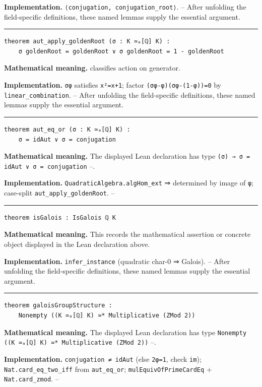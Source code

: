 \documentclass[UTF8,a4paper,11pt,fontset=fandol]{ctexart}
\theoremstyle{definition}
\newcommand{\statementsep}{\par\medskip\hrule\medskip}
\begin{document}
\noindent\textbf{Implementation.} \texttt{⟨conjugation, conjugation\_\allowbreak{}root⟩}. -- After unfolding the field-specific definitions, these named lemmas supply the essential argument.\par
\statementsep
\begin{verbatim}
theorem aut_apply_goldenRoot (σ : K ≃ₐ[ℚ] K) :
    σ goldenRoot = goldenRoot ∨ σ goldenRoot = 1 - goldenRoot
\end{verbatim}
\noindent\textbf{Mathematical meaning.} classifies action on generator.\par
\noindent\textbf{Implementation.} \texttt{σφ} satisfies \texttt{x²=x+1}; factor \texttt{(σφ-φ)(σφ-(1-φ))=0} by \texttt{linear\_\allowbreak{}combination}. -- After unfolding the field-specific definitions, these named lemmas supply the essential argument.\par
\statementsep
\begin{verbatim}
theorem aut_eq_or (σ : K ≃ₐ[ℚ] K) :
    σ = idAut ∨ σ = conjugation
\end{verbatim}
\noindent\textbf{Mathematical meaning.} The displayed Lean declaration has type \texttt{(σ) → σ = idAut ∨ σ = conjugation} --.\par
\noindent\textbf{Implementation.} \texttt{QuadraticAlgebra.\allowbreak{}algHom\_\allowbreak{}ext} ⇒ determined by image of \texttt{φ}; case-split \texttt{aut\_\allowbreak{}apply\_\allowbreak{}goldenRoot}. --\par
\statementsep
\begin{verbatim}
theorem isGalois : IsGalois ℚ K
\end{verbatim}
\noindent\textbf{Mathematical meaning.} This records the mathematical assertion or concrete object displayed in the Lean declaration above.\par
\noindent\textbf{Implementation.} \texttt{infer\_\allowbreak{}instance} (quadratic char-0 ⇒ Galois). -- After unfolding the field-specific definitions, these named lemmas supply the essential argument.\par
\statementsep
\begin{verbatim}
theorem galoisGroupStructure :
    Nonempty ((K ≃ₐ[ℚ] K) ≃* Multiplicative (ZMod 2))
\end{verbatim}
\noindent\textbf{Mathematical meaning.} The displayed Lean declaration has type \texttt{Nonempty ((K ≃ₐ[ℚ] K) ≃* Multiplicative (ZMod 2))} --.\par
\noindent\textbf{Implementation.} \texttt{conjugation ≠ idAut} (else \texttt{2φ=1}, check \texttt{im}); \texttt{Nat.\allowbreak{}card\_\allowbreak{}eq\_\allowbreak{}two\_\allowbreak{}iff} from \texttt{aut\_\allowbreak{}eq\_\allowbreak{}or}; \texttt{mulEquivOfPrimeCardEq} + \texttt{Nat.\allowbreak{}card\_\allowbreak{}zmod}. --\par
\end{document}

